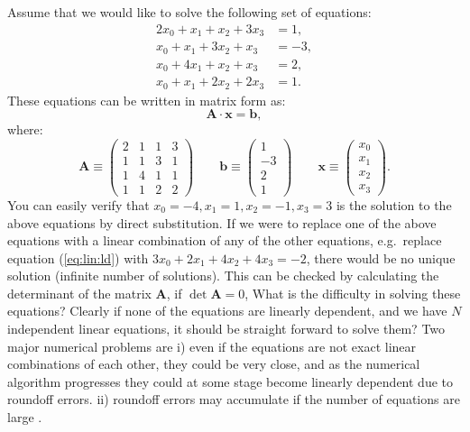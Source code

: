\documentclass[graybox,sectrefs,envcountresetchap,open=right,final]{svmonodo}
\begin{document}
Assume that we would like to solve the following set of equations:
\begin{align}
2x_0+x_1+x_2+3x_3&=1, \label{eq:lin:la} \\ 
x_0+x_1+3x_2+x_3&=-3, \label{eq:lin:lb} \\ 
x_0+4x_1+x_2+x_3&=2, \label{eq:lin:lc} \\ 
x_0+x_1+2x_2+2x_3&=1. \label{eq:lin:ld} 
\end{align}
These equations can be written in matrix form as:
\begin{equation}
\mathbf{A\cdot x}=\mathbf{b},
\label{eq:lin:mat}
\end{equation}
where:
\begin{equation}
\mathbf{A}\equiv\begin{pmatrix}
2&1&1&3\\ 
1&1&3&1\\ 
1&4&1&1\\ 
1&1&2&2
\end{pmatrix}
\qquad
\mathbf{b}\equiv
\begin{pmatrix}
1\\-3\\2\\1
\end{pmatrix}
\qquad
\mathbf{x}\equiv
\begin{pmatrix}
x_0\\x_1\\x_2\\x_3
\end{pmatrix}.
\label{eq:lin:matA}
\end{equation}
You can easily verify that $x_0=-4, x_1=1, x_2=-1, x_3= 3$ is the
solution to the above equations by direct substitution. If we were to
replace one of the above equations with a linear combination of any of
the other equations, e.g.~replace equation (\ref{eq:lin:ld}) with
$3x_0+2x_1+4x_2+4x_3=-2$, there would be no unique solution (infinite
number of solutions). This can be checked by calculating the determinant of the matrix $\mathbf{A}$, if $\det \mathbf{A}=0 $,  
What is the difficulty in solving these equations? Clearly if none of the equations are linearly dependent, and we have $N$ independent linear equations, it should be straight forward to solve them? Two major numerical problems are i) even if the equations are not exact linear combinations of each other, they could be very close, and as the numerical algorithm progresses they could at some stage become linearly dependent due to roundoff errors. ii) roundoff errors may accumulate if the number of equations are large \cite{press2007}.
\end{document}
